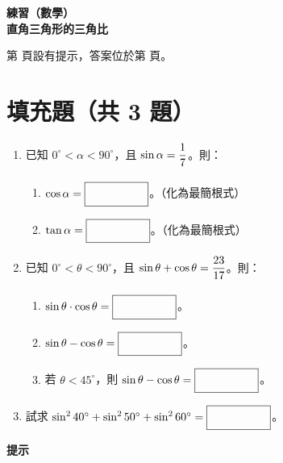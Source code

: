 \documentclass[10pt]{article}
\newcommand*{\blank}[1]{\rule[-.7\baselineskip]{0pt}{1.8\baselineskip}\fbox{\rule[-.4\baselineskip]{0pt}{1.2\baselineskip}\hspace{#1}}}
\newcommand*{\fraction}[2]{\rule[-.8\baselineskip]{0pt}{2\baselineskip}\dfrac{#1}{#2}}
\renewcommand*{\maketitle}{{%
  \bfseries
  \LARGE 練習（數學） \\
  \large 直角三角形的三角比 \par
}}
\begin{document}
\maketitle
\medskip
第 \pageref{hint} 頁設有提示，答案位於第 \pageref{answer} 頁。
\section{填充題（共 3 題）}
\begin{enumerate}[label=\Alph*.,align=left,leftmargin=*,labelsep=.3em]
  \item 已知 $0^\circ < \alpha < 90^\circ$，且 $\sin\alpha = \fraction{1}{7}$。則：
  \begin{enumerate}[label=(\arabic*),left=0pt]
    \item $\cos\alpha = \blank{5em}$。（化為最簡根式）
    \item $\tan\alpha = \blank{5em}$。（化為最簡根式）
  \end{enumerate}
  \newpage
  \item 已知 $0^\circ < \theta < 90^\circ$，且 $\sin\theta + \cos\theta = \fraction{23}{17}$。則：
  \begin{enumerate}[label=(\arabic*),left=0pt]
    \item $\sin\theta \cdot \cos\theta = \blank{5em}$。
    \item $\sin\theta - \cos\theta = \blank{5em}$。
    \item 若 $\theta < 45^\circ$，則 $\sin\theta - \cos\theta = \blank{5em}$。
  \end{enumerate}
  \newpage
  \item 試求 $\sin^2 40^\circ + \sin^2 50^\circ + \sin^2 60^\circ = \blank{5em}$。
\end{enumerate}

\newpage
\label{hint}
{\bfseries\large 提示 \par}
\setcounter{section}{0}
\end{document}
